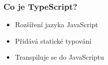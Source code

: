 \begin{frame}
    \frametitle{Co je TypeScript?}
    \begin{itemize}
        \item<1-> Rozšíření jazyka JavaScript
        \item<2-> Přidává statické typování
        \item<3-> Transpiluje se do JavaScriptu
    \end{itemize}
\end{frame}